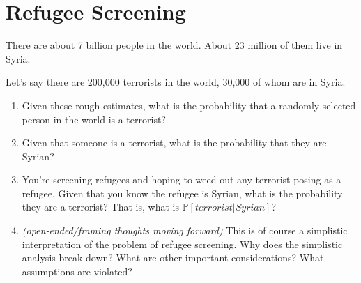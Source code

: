 \documentclass{article}
\begin{document}
\section{Refugee Screening}

There are about 7 billion people in the world. About 23 million of them live in Syria.

Let's say there are 200,000 terrorists in the world, 30,000 of whom are in Syria.

\begin{enumerate}
\item Given these rough estimates, what is the probability that a randomly selected person in the world is a terrorist?
\item Given that someone is a terrorist, what is the probability that they are Syrian?
\item You're screening refugees and hoping to weed out any terrorist posing as a refugee. Given that you know the refugee is Syrian, what is the probability they are a terrorist? That is, what is $\mathbb{P}[terrorist|Syrian]$?
\item \textit{(open-ended/framing thoughts moving forward)} This is of course a simplistic interpretation of the problem of refugee screening. Why does the simplistic analysis break down? What are other important considerations? What assumptions are violated?
\end{enumerate}
\end{document}
